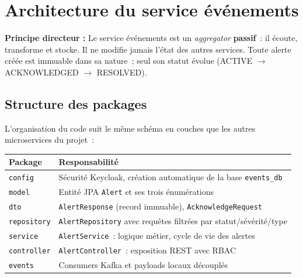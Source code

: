 \documentclass[12pt,a4paper]{article}
\begin{document}
\newpage
\section{Architecture du service événements}

\begin{infobox}
\textbf{Principe directeur :} Le service événements est un \textit{aggregator}
\textbf{passif}~: il écoute, transforme et stocke. Il ne modifie jamais l'état
des autres services. Toute alerte créée est immuable dans sa nature~; seul son
statut évolue (ACTIVE $\to$ ACKNOWLEDGED $\to$ RESOLVED).
\end{infobox}

\vspace{0.5cm}

\subsection{Structure des packages}

L'organisation du code suit le même schéma en couches que les autres microservices
du projet~:

\begin{center}
\begin{tabular}{|l|l|}
  \hline
  \rowcolor{primary!10}
  \textbf{Package} & \textbf{Responsabilité} \\
  \hline
  \texttt{config}      & Sécurité Keycloak, création automatique de la base \texttt{events\_db} \\
  \texttt{model}       & Entité JPA \texttt{Alert} et ses trois énumérations \\
  \texttt{dto}         & \texttt{AlertResponse} (record immuable), \texttt{AcknowledgeRequest} \\
  \texttt{repository}  & \texttt{AlertRepository} avec requêtes filtrées par statut/sévérité/type \\
  \texttt{service}     & \texttt{AlertService}~: logique métier, cycle de vie des alertes \\
  \texttt{controller}  & \texttt{AlertController}~: exposition REST avec RBAC \\
  \texttt{events}      & Consumers Kafka et payloads locaux découplés \\
  \hline
\end{tabular}
\end{center}
\end{document}
